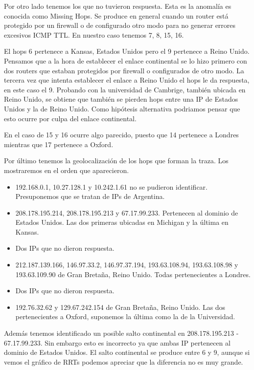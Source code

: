 Por otro lado tenemos los que no tuvieron respuesta. Esta es la anomalía es conocida como Missing Hops.
Se produce en general cuando un router está protegido por un firewall o de configurado otro modo para no
generar errores excesivos ICMP TTL. En nuestro caso tenemos 7, 8, 15, 16.

El hops 6 pertenece a Kansas, Estados Unidos pero el 9 pertenece a Reino Unido. Pensamos que a la hora de
establecer el enlace continental se lo hizo primero con dos routers que estaban protegidos por firewall o
configurados de otro modo. La tercera vez que intenta establecer el enlace a Reino Unido el hops le da
respuesta, en este caso el 9. Probando con la universidad de Cambrige, también ubicada en Reino Unido, se
obtiene que también se pierden hops entre una IP de Estados Unidos y la de Reino Unido. Como hipótesis
alternativa podriamos pensar que esto ocurre por culpa del enlace continental.%

En el caso de 15 y 16 ocurre algo parecido, puesto que 14 pertenece a Londres mientras que 17 pertenece a
Oxford.

Por último tenemos la geolocalización de los hops que forman la traza. Los mostraremos en el orden que
aparecieron.

\begin{itemize}
\item 192.168.0.1, 10.27.128.1 y 10.242.1.61 no se pudieron identificar. Presuponemos que se tratan de IPs
de Argentina.
\item 208.178.195.214, 208.178.195.213 y 67.17.99.233. Pertenecen al dominio de Estados Unidos. Las dos
primeras ubicadas en Michigan y la última en Kansas.
\item Dos IPs que no dieron respuesta.
\item 212.187.139.166, 146.97.33.2, 146.97.37.194, 193.63.108.94, 193.63.108.98 y 193.63.109.90 de
Gran Bretaña, Reino Unido. Todas pertenecientes a Londres.
\item Dos IPs que no dieron respuesta.
\item 192.76.32.62 y 129.67.242.154 de Gran Bretaña, Reino Unido. Las dos pertenecientes a Oxford, suponemos
la última como la de la Universidad.
\end{itemize}

Además tenemos identificado un posible salto continental en 208.178.195.213 - 67.17.99.233. Sin embargo esto
es incorrecto ya que ambas IP pertenecen al dominio de Estados Unidos. El salto continental se produce entre
6 y 9, aunque si vemos el gráfico de RRTs podemos apreciar que la diferencia no es muy grande.

